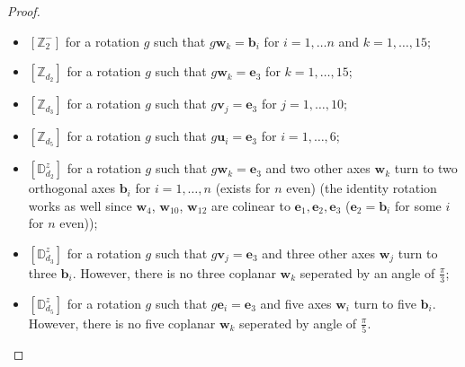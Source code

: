 \documentclass[11pt,a4paper]{amsart}
\theoremstyle{definition}
\newcommand{\ZZ}{\mathbb{Z}}                %
\newcommand{\SO}{\mathrm{SO}}               %
\newcommand{\octa}{\mathbb{O}}              %
\newcommand{\DD}{\mathbb{D}}                %
\newcommand{\1}{\mathds{1}}		            %
\newcommand{\ee}{\pmb{e}}                   %
\newcommand{\uu}{\pmb{u}}                   %
\newcommand{\vv}{\pmb{v}}                   %
\newcommand{\vR}{\mathbf{r}}
\newcommand{\bs}{\mathbf{s}}
\newcommand{\be}{\mathbf{e}}
\newcommand{\ba}{\mathbf{a}}
\newcommand{\bb}{\mathbf{b}}
\newcommand{\Dnz}{\DD_n^z}
\begin{document}
\begin{proof}
\begin{itemize}
			\item $[\ZZ_2^-]$ for a rotation $g$ such that $g\pmb{w}_{k}=\bb_i$ for $ i=1,\dotsc n$ and $k=1,\dotsc,15$;
			\item $[\ZZ_{d_2}]$ for a rotation $g$ such that $g\pmb{w}_{k}= \ee_3$ for $k=1,\dotsc,15$;
			\item $[\ZZ_{d_3}]$ for a rotation $g$ such that $g\vv_{j}= \ee_3$ for $j=1,\dotsc,10$;
			\item $[\ZZ_{d_5}]$ for a rotation $g$ such that $g\uu_i= \ee_3$ for $i=1,\dotsc,6$;
			\item $[\DD_{d_2}^z]$ for a rotation $g$ such that $g\pmb{w}_{k}= \ee_3$ and two other axes $\pmb{w}_{k}$ turn to two orthogonal axes $ \bb_i$ for $i=1,\dotsc,n$ (exists for $n$ even) (the identity rotation works as well since $\pmb{w}_{4}$, $\pmb{w}_{10}$, $\pmb{w}_{12}$ are colinear to $\ee_1,\ee_2,\ee_3$ ($\ee_2=\bb_i$ for some $i$ for $n$ even));
			\item $[\DD_{d_3}^z]$ for a rotation $g$ such that $g\vv_j= \ee_3$ and three other axes $\pmb{w}_j$ turn to three $ \bb_i$. However, there is no three coplanar $\pmb{w}_k$ seperated by an angle of $\frac{\pi}{3}$;
			\item $[\DD_{d_5}^z]$ for a rotation $g$ such that $g\ee_i= \ee_3$ and five axes $\pmb{w}_i$ turn to five $\bb_i$. However, there is no five coplanar $\pmb{w}_k$ seperated by angle of $\frac{\pi}{5}$.
		\end{itemize}
	\end{proof}
%
\end{document}
